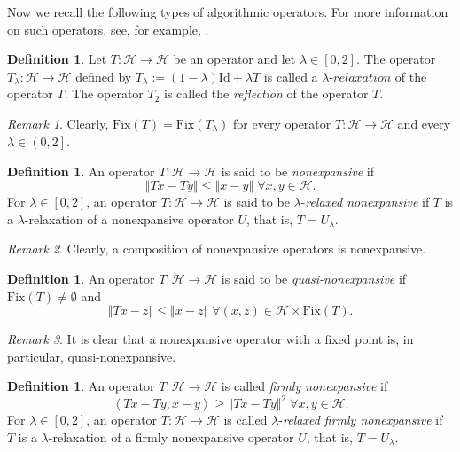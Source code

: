 \documentclass[]{interact}
\theoremstyle{plain}%
\theoremstyle{definition}
\newtheorem{definition}[theorem]{Definition}
\theoremstyle{remark}
\newtheorem{remark}{Remark}
\begin{document}
Now we recall the following types of algorithmic operators. For more
information on such operators, see, for example, \cite{key-11}.
\begin{definition}
Let $T:\mathcal{H}\rightarrow\mathscr{\mathcal{H}}$ be an operator
and let $\lambda\in\left[0,2\right]$. The operator $T_{\lambda}:\mathcal{H}\rightarrow\mathscr{\mathcal{H}}$
defined by $T_{\lambda}:=\left(1-\lambda\right)\mathrm{Id}+\lambda T$
is called a $\lambda$-$relaxation$ of the operator $T$. The operator
$T_{2}$ is called the \textit{reflection} of the operator $T$.
\end{definition}
\begin{remark}
\label{Relaxation has the same Fix} Clearly, $\mathrm{Fix}(T)=\mathrm{Fix}(T_{\lambda})$
for every operator $T:\mathcal{H}\rightarrow\mathcal{H}$ and every
$\lambda\in\left(0,2\right]$.
\end{remark}
\begin{definition}
An operator $T:\mathcal{H}\rightarrow\mathcal{H}$ is said to be \textit{nonexpansive}
if
\[
\left\Vert Tx-Ty\right\Vert \leq\left\Vert x-y\right\Vert \;\forall x,y\in\mathcal{H}.
\]
For $\lambda\in\left[0,2\right]$, an operator $T:\mathcal{H}\rightarrow\mathcal{H}$
is said to be $\lambda$-\textit{relaxed nonexpansive} if $T$ is
a $\lambda$-relaxation of a nonexpansive operator $U$, that is,
$T=U_{\lambda}$.
\end{definition}
\begin{remark}
\label{ComposNE}Clearly, a composition of nonexpansive operators
is nonexpansive.
\end{remark}
\begin{definition}
An operator $T:\mathcal{H}\rightarrow\mathcal{H}$ is said to be \textit{quasi-nonexpansive}
if $\mathrm{Fix}\left(T\right)\not=\emptyset$ and
\[
\left\Vert Tx-z\right\Vert \le\left\Vert x-z\right\Vert \;\forall (x,z)\in\mathcal{H}\times\mathrm{Fix}\left(T\right).
\]
\end{definition}
\begin{remark}
\label{NE is QNE}It is clear that a nonexpansive operator with
a fixed point is, in particular, quasi-nonexpansive.
\end{remark}
\begin{definition}
An operator $T:\mathcal{H}\rightarrow\mathcal{H}$ is called \textit{firmly
nonexpansive} if
\[
\left\langle Tx-Ty,x-y\right\rangle \ge\left\Vert Tx-Ty\right\Vert ^{2}\;\forall x,y\in\mathcal{H}.
\]
For $\lambda\in\left[0,2\right]$, an operator $T:\mathcal{H}\rightarrow\mathcal{H}$
is called $\lambda$-\textit{relaxed firmly nonexpansive} if $T$
is a $\lambda$-relaxation of a firmly nonexpansive operator $U$,
that is, $T=U_{\lambda}$.
\end{definition}
\end{document}
